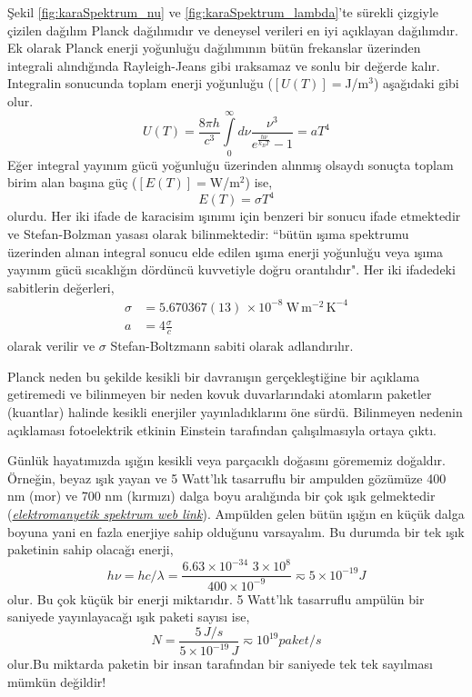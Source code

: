 \documentclass[a4paper,12pt, twoside]{article}
\begin{document}
Şekil \ref{fig:karaSpektrum_nu} ve \ref{fig:karaSpektrum_lambda}'te sürekli çizgiyle çizilen dağılım Planck dağılımıdır ve deneysel verileri en iyi açıklayan dağılımdır. Ek olarak Planck enerji yoğunluğu dağılımının bütün frekanslar üzerinden integrali alındığında Rayleigh-Jeans gibi ıraksamaz ve sonlu bir değerde kalır. Integralin sonucunda toplam enerji yoğunluğu ($[U(T)]=$J/m$^3$) aşağıdaki gibi olur.
\begin{equation}
\label{eq:Planck_U_total}
U(T) = \frac{8 \pi h}{c^{3}} \int\limits_0^\infty d\nu \frac{\nu^{3}}{e^{\frac{h \nu}{k_{B} T}} - 1} = a T^4
\end{equation}
Eğer integral yayınım gücü yoğunluğu üzerinden alınmış olsaydı sonuçta toplam birim alan başına güç ($[E(T)]=$W/m$^2$) ise,
\begin{equation}
\label{eq:Planck_E_total}
E(T) = \sigma T^4
\end{equation}
olurdu. Her iki ifade de karacisim ışınımı için benzeri bir sonucu ifade etmektedir ve Stefan-Bolzman yasası olarak bilinmektedir: ``bütün ışıma spektrumu üzerinden alınan integral sonucu elde edilen ışıma enerji yoğunluğu veya ışıma yayınım gücü sıcaklığın dördüncü kuvvetiyle doğru orantılıdır". Her iki ifadedeki sabitlerin değerleri,
\begin{align}
\label{eq:stefan_boltzman}
\sigma &=  5.670367(13) \, \times 10^{-8}\ \textrm{W}\,\textrm{m}^{-2}\,\textrm{K}^{-4} \\
a &= 4\frac{\sigma}{c} \nonumber
\end{align}
olarak verilir ve $\sigma$ Stefan-Boltzmann sabiti \cite{codata:stefan_boltzman} olarak adlandırılır.


Planck neden bu şekilde kesikli bir davranışın gerçekleştiğine bir açıklama getiremedi ve bilinmeyen bir neden kovuk duvarlarındaki atomların paketler (kuantlar) halinde kesikli enerjiler yayınladıklarını öne sürdü. Bilinmeyen nedenin açıklaması fotoelektrik etkinin Einstein tarafından çalışılmasıyla ortaya çıktı.

Günlük hayatımızda ışığın kesikli veya parçacıklı doğasını görememiz doğaldır. Örneğin, beyaz ışık yayan ve 5 Watt'lık tasarruflu bir ampulden gözümüze 400 nm (mor) ve 700 nm (kırmızı) dalga boyu aralığında bir çok ışık gelmektedir ({\it \href {https://upload.wikimedia.org/wikipedia/commons/2/25/Electromagnetic-Spectrum.svg}{elektromanyetik spektrum web link}}). Ampülden gelen bütün ışığın en küçük dalga boyuna yani en fazla enerjiye sahip olduğunu varsayalım. Bu durumda bir tek ışık paketinin sahip olacağı enerji,
\begin{equation}
\label{eq:example_light_quanta01}
h\nu = h c/\lambda = \frac{6.63\times10^{-34}\,\,3\times10^{8}}{400\times10^{-9}} \eqsim 5\times 10^{-19} J 
\end{equation}
olur. Bu çok küçük bir enerji miktarıdır. 5 Watt'lık tasarruflu ampülün bir saniyede yayınlayacağı ışık paketi sayısı ise,
\begin{equation}
\label{eq:example_light_quanta02}
N = \frac{5\,J/s}{5\times10^{-19}\,J} \eqsim 10^{19} paket/s
\end{equation}
olur.Bu miktarda paketin bir insan tarafından bir saniyede tek tek sayılması mümkün değildir!
\end{document}
